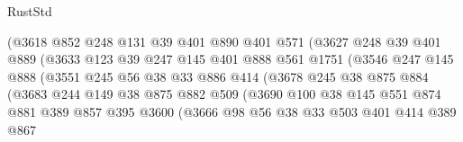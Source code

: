 \begin{lexlean}{RustStd}
\begin{coremodule}
                        (@3618
                          @852
                          @248
                          @131
                          @39
                          @401
                          @890
                          @401
                          @571
                          (@3627
                            @248
                            @39
                            @401
                            @889
                            (@3633
                              @123
                              @39
                              @247
                              @145
                              @401
                              @888
                              @561
                              @1751
                              (@3546
                                @247
                                @145
                                @888
                                (@3551
                                  @245
                                  @56
                                  @38
                                  @33
                                  @886
                                  @414
                                  (@3678
                                    @245
                                    @38
                                    @875
                                    @884
                                    (@3683
                                      @244
                                      @149
                                      @38
                                      @875
                                      @882
                                      @509
                                      (@3690
                                        @100
                                        @38
                                        @145
                                        @551
                                        @874
                                        @881
                                        @389
                                        @857
                                        @395
                                        @3600
                                        (@3666
                                          @98
                                          @56
                                          @38
                                          @33
                                          @503
                                          @401
                                          @414
                                          @389
                                          @867

\end{coremodule}
\end{lexlean}
